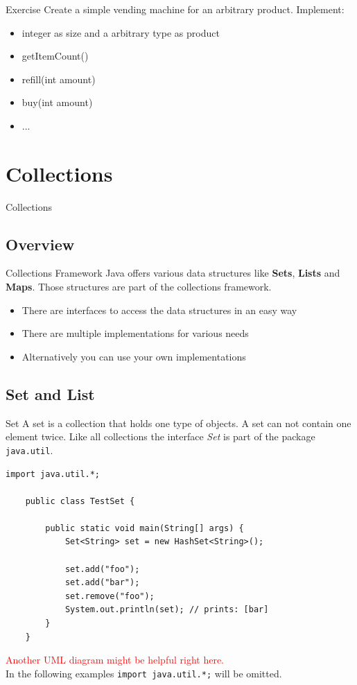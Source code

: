 \begin{frame}[fragile]{Exercise}
	Create a simple vending machine for an arbitrary product.
	Implement:
	\begin{itemize}
		\item integer as size and a arbitrary type as product
		\item getItemCount()
		\item refill(int amount)
		\item buy(int amount)
		\item ...
	\end{itemize}
\end{frame}

\section{Collections}
\begin{frame}
	\huge Collections
\end{frame}

\subsection{Overview}
\begin{frame}{Collections Framework}
	Java offers various data structures like \textbf{Sets}, \textbf{Lists} and \textbf{Maps}.
	Those structures are part of the collections framework.
	\pause
	\begin{itemize}
		\item There are interfaces to access the data structures in an easy way
		\item There are multiple implementations for various needs
		\item Alternatively you can use your own implementations
	\end{itemize}
	
\end{frame}

\subsection{Set and List}
\begin{frame}[fragile]{Set}
	A set is a collection that holds one type of objects.
	A set can not contain one element twice.
	Like all collections the interface \emph{Set} is part of the package \texttt{java.util}.
	\begin{lstlisting}[basicstyle=\ttfamily\scriptsize]
	import java.util.*;

	public class TestSet {
	    
	    public static void main(String[] args) {
	        Set<String> set = new HashSet<String>();
	    
	        set.add("foo");
	        set.add("bar");
	        set.remove("foo");
	        System.out.println(set); // prints: [bar]
	    }
	}
	\end{lstlisting}
	\textcolor{red}{Another UML diagram might be helpful right here.}\\
	In the following examples \texttt{import java.util.*;} will be omitted.
\end{frame}

